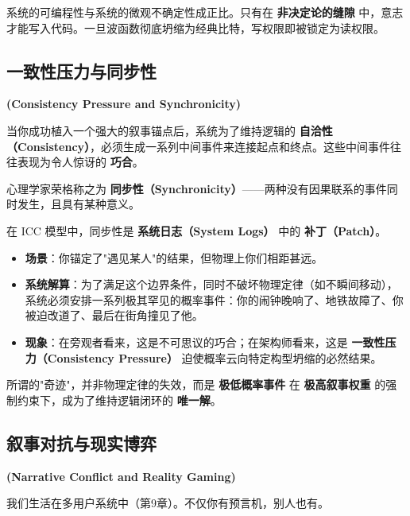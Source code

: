 \begin{theorem}[不确定性利用定理]
系统的可编程性与系统的微观不确定性成正比。只有在 \textbf{非决定论的缝隙} 中，意志才能写入代码。一旦波函数彻底坍缩为经典比特，写权限即被锁定为读权限。
\end{theorem}

\subsection{一致性压力与同步性}

\textbf{(Consistency Pressure and Synchronicity)}

当你成功植入一个强大的叙事锚点后，系统为了维持逻辑的 \textbf{自洽性（Consistency）}，必须生成一系列中间事件来连接起点和终点。这些中间事件往往表现为令人惊讶的 \textbf{巧合}。

心理学家荣格称之为 \textbf{同步性（Synchronicity）}——两种没有因果联系的事件同时发生，且具有某种意义。

在 ICC 模型中，同步性是 \textbf{系统日志（System Logs）} 中的 \textbf{补丁（Patch）}。

\begin{itemize}
\item \textbf{场景}：你锚定了"遇见某人"的结果，但物理上你们相距甚远。

\item \textbf{系统解算}：为了满足这个边界条件，同时不破坏物理定律（如不瞬间移动），系统必须安排一系列极其罕见的概率事件：你的闹钟晚响了、地铁故障了、你被迫改道了、最后在街角撞见了他。

\item \textbf{现象}：在旁观者看来，这是不可思议的巧合；在架构师看来，这是 \textbf{一致性压力（Consistency Pressure）} 迫使概率云向特定构型坍缩的必然结果。
\end{itemize}

\begin{corollary}[奇迹的定义]
所谓的"奇迹"，并非物理定律的失效，而是 \textbf{极低概率事件} 在 \textbf{极高叙事权重} 的强制约束下，成为了维持逻辑闭环的 \textbf{唯一解}。
\end{corollary}

\subsection{叙事对抗与现实博弈}

\textbf{(Narrative Conflict and Reality Gaming)}

我们生活在多用户系统中（第9章）。不仅你有预言机，别人也有。

